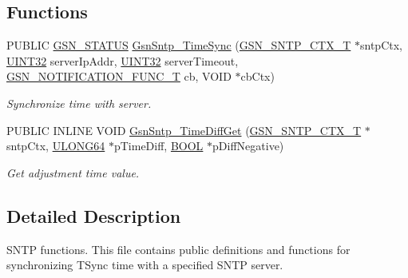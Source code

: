 \subsection*{Functions}
\begin{DoxyCompactItemize}
\item 
PUBLIC \hyperlink{a00660_gada5951904ac6110b1fa95e51a9ddc217}{GSN\_\-STATUS} \hyperlink{a00672_ga71cfb857bfbf8d5de080ef4f5807b0d0}{GsnSntp\_\-TimeSync} (\hyperlink{a00227}{GSN\_\-SNTP\_\-CTX\_\-T} $\ast$sntpCtx, \hyperlink{a00660_gae1e6edbbc26d6fbc71a90190d0266018}{UINT32} serverIpAddr, \hyperlink{a00660_gae1e6edbbc26d6fbc71a90190d0266018}{UINT32} serverTimeout, \hyperlink{a00481_aac7371fae4e423f90332caf551b62cf1}{GSN\_\-NOTIFICATION\_\-FUNC\_\-T} cb, VOID $\ast$cbCtx)
\begin{DoxyCompactList}\small\item\em Synchronize time with server. \end{DoxyCompactList}\item 
PUBLIC INLINE VOID \hyperlink{a00672_ga0e7313023463ed1799f84c4b49ad4f91}{GsnSntp\_\-TimeDiffGet} (\hyperlink{a00227}{GSN\_\-SNTP\_\-CTX\_\-T} $\ast$sntpCtx, \hyperlink{a00660_ga28961430434ccabca6862ea93fe9a15b}{ULONG64} $\ast$pTimeDiff, \hyperlink{a00660_ga1f04022c0a182c51c059438790ea138c}{BOOL} $\ast$pDiffNegative)
\begin{DoxyCompactList}\small\item\em Get adjustment time value. \end{DoxyCompactList}\end{DoxyCompactItemize}


\subsection{Detailed Description}
SNTP functions. This file contains public definitions and functions for synchronizing TSync time with a specified SNTP server. \par


